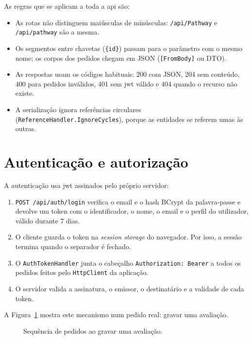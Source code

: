 As regras que se aplicam a toda a \gls{api} são:

\begin{itemize}
    \item As rotas não distinguem maiúsculas de minúsculas: \texttt{/api/Pathway} e \texttt{/api/pathway} são a mesma.
    \item Os segmentos entre chavetas (\texttt{\{id\}}) passam para o parâmetro com o mesmo nome; os corpos dos pedidos chegam em JSON (\texttt{[FromBody]} ou DTO).
    \item As respostas usam os códigos habituais: 200 com JSON, 204 sem conteúdo, 400 para pedidos inválidos, 401 sem \gls{jwt} válido e 404 quando o recurso não existe.
    \item A serialização ignora referências circulares (\texttt{ReferenceHandler.IgnoreCycles}), porque as entidades se referem umas às outras.
\end{itemize}

\section{Autenticação e autorização}

A autenticação usa \gls{jwt} assinados pelo próprio servidor:

\begin{enumerate}
    \item \texttt{POST /api/auth/login} verifica o email e o hash BCrypt da palavra-passe e devolve um token com o identificador, o nome, o email e o perfil do utilizador, válido durante 7 dias.
    \item O cliente guarda o token na \emph{session storage} do navegador. Por isso, a sessão termina quando o separador é fechado.
    \item O \texttt{AuthTokenHandler} junta o cabeçalho \texttt{Authorization: Bearer} a todos os pedidos feitos pelo \texttt{HttpClient} da aplicação.
    \item O servidor valida a assinatura, o emissor, o destinatário e a validade de cada token.
\end{enumerate}

A Figura~\ref{fig:sequencia} mostra este mecanismo num pedido real: gravar uma avaliação.

\begin{figure}[H]
    \centering
    \resizebox{\linewidth}{!}{}
    \caption{Sequência de pedidos ao gravar uma avaliação.}
    \label{fig:sequencia}
\end{figure}


